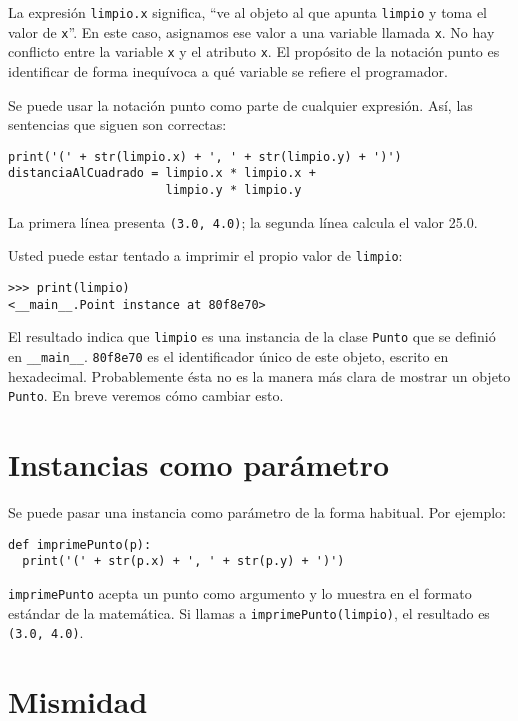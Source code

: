 La expresión \texttt{limpio.x} significa, ``ve al objeto al que apunta
\texttt{limpio} y toma el valor de \texttt{x}''. En este caso, asignamos
ese valor a una variable llamada \texttt{x}. No hay conflicto entre
la variable \texttt{x} y el atributo \texttt{x}. El propósito de la
notación punto es identificar de forma inequívoca a qué variable se
refiere el programador.

Se puede usar la notación punto como parte de cualquier expresión.
Así, las sentencias que siguen son correctas:
\begin{lstlisting}
print('(' + str(limpio.x) + ', ' + str(limpio.y) + ')')
distanciaAlCuadrado = limpio.x * limpio.x + 
                      limpio.y * limpio.y
\end{lstlisting}

La primera línea presenta \texttt{(3.0, 4.0)}; la segunda línea calcula
el valor 25.0.

Usted puede estar tentado a imprimir el propio valor de \texttt{limpio}:
\begin{lstlisting}
>>> print(limpio)
<__main__.Point instance at 80f8e70>
\end{lstlisting}

El resultado indica que \texttt{limpio} es una instancia de la clase
\texttt{Punto} que se definió en \texttt{\_\_main\_\_}. \texttt{80f8e70}
es el identificador único de este objeto, escrito en hexadecimal.
Probablemente ésta no es la manera más clara de mostrar un objeto
\texttt{Punto}. En breve veremos cómo cambiar esto.


\section{Instancias como parámetro}

 

Se puede pasar una instancia como parámetro de la forma habitual.
Por ejemplo:
\begin{lstlisting}
def imprimePunto(p):
  print('(' + str(p.x) + ', ' + str(p.y) + ')')
\end{lstlisting}

\texttt{imprimePunto} acepta un punto como argumento y lo muestra
en el formato estándar de la matemática. Si llamas a \texttt{imprimePunto(limpio)},
el resultado es \texttt{(3.0, 4.0)}.

\section{Mismidad}

